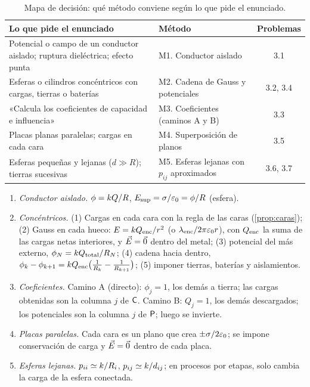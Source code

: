 \begin{table}[ht]
\centering
\caption{Mapa de decisión: qué método conviene según lo que pide el enunciado.}
\label{tab:mapa}
\small
\begin{tabularx}{\linewidth}{@{}>{\raggedright\arraybackslash}X>{\raggedright\arraybackslash}p{5.6cm}c@{}}
  \toprule
  Lo que pide el enunciado & Método & Problemas\\
  \midrule
  Potencial o campo de un conductor aislado; ruptura dieléctrica; efecto punta & M1. Conductor aislado & 3.1\\
  Esferas o cilindros concéntricos con cargas, tierras o baterías & M2. Cadena de Gauss y potenciales & 3.2, 3.4\\
  «Calcula los coeficientes de capacidad e influencia» & M3. Coeficientes (caminos A y B) & 3.3\\
  Placas planas paralelas; cargas en cada cara & M4. Superposición de planos & 3.5\\
  Esferas pequeñas y lejanas ($d\gg R$); tierras sucesivas & M5. Esferas lejanas con $p_{ij}$ aproximados & 3.6, 3.7\\
  \bottomrule
\end{tabularx}
\end{table}

\begin{receta}
\begin{enumerate}[label=\textbf{M\arabic*.}, leftmargin=2.2em]
  \item \emph{Conductor aislado.} $\phi=k Q/R$, $E_{\mathrm{sup}}=\sigma/\varepsilon_{0}=\phi/R$ (esfera).
  \item \emph{Concéntricos.} (1) Cargas en cada cara con la regla de las caras (\cref{prop:caras}); (2) Gauss en cada hueco: $E=kQ_{\mathrm{enc}}/r^{2}$ (o
        $\lambda_{\mathrm{enc}}/2\pi\varepsilon_{0} r$), con $Q_{\mathrm{enc}}$ la suma de las cargas netas interiores, y $\vec{E}=\vec{0}$ dentro del metal; (3) potencial del más
        externo, $\phi_N=k Q_{\mathrm{total}}/R_N$; (4) cadena hacia dentro, $\phi_k-\phi_{k+1}=kQ_{\mathrm{enc}}\bigl(\frac{1}{R_k}-\frac{1}{R_{k+1}}\bigr)$;
        (5) imponer tierras, baterías y aislamientos.
  \item \emph{Coeficientes.} Camino A (directo): $\phi_j=1$, los demás a tierra; las cargas obtenidas son la columna $j$ de $\mathsf{C}$. Camino B: $Q_j=1$,
        los demás descargados; los potenciales son la columna $j$ de $\mathsf{P}$; luego se invierte.
  \item \emph{Placas paralelas.} Cada cara es un plano que crea $\pm\sigma/2\varepsilon_{0}$; se impone conservación de carga y $\vec{E}=\vec{0}$ dentro de cada placa.
  \item \emph{Esferas lejanas.} $p_{ii}\simeq k/R_i$, $p_{ij}\simeq k/d_{ij}$; en procesos por etapas, solo cambia la carga de la esfera conectada.
\end{enumerate}
\end{receta}


